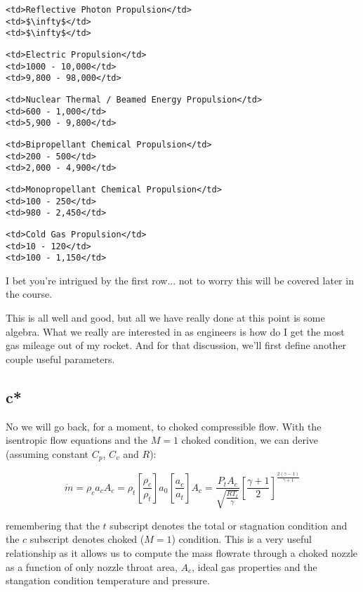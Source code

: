 \documentclass[11pt]{article}
\begin{document}
\begin{verbatim}
<td>Reflective Photon Propulsion</td>
<td>$\infty$</td>
<td>$\infty$</td>
\end{verbatim}

\begin{verbatim}
<td>Electric Propulsion</td>
<td>1000 - 10,000</td>
<td>9,800 - 98,000</td>
\end{verbatim}

\begin{verbatim}
<td>Nuclear Thermal / Beamed Energy Propulsion</td>
<td>600 - 1,000</td>
<td>5,900 - 9,800</td>
\end{verbatim}

\begin{verbatim}
<td>Bipropellant Chemical Propulsion</td>
<td>200 - 500</td>
<td>2,000 - 4,900</td>
\end{verbatim}

\begin{verbatim}
<td>Monopropellant Chemical Propulsion</td>
<td>100 - 250</td>
<td>980 - 2,450</td>
\end{verbatim}

\begin{verbatim}
<td>Cold Gas Propulsion</td>
<td>10 - 120</td>
<td>100 - 1,150</td>
\end{verbatim}

I bet you're intrigued by the first row... not to worry this will be
covered later in the course.

This is all well and good, but all we have really done at this point is
some algebra. What we really are interested in as engineers is how do I
get the most gas mileage out of my rocket. And for that discussion,
we'll first define another couple useful parameters.

    \subsection{c*}\label{c}

No we will go back, for a moment, to choked compressible flow. With the
isentropic flow equations and the \(M=1\) choked condition, we can
derive (assuming constant \(C_p\), \(C_v\) and \(R\)):

\[\dot{m} = \rho_c a_c A_c  = \rho_t \left[ \frac{\rho_c}{\rho_t}\right]a_0 \left[ \frac{a_c}{a_t}\right]A_c = \frac{P_t A_c}{\sqrt{\frac{R T_t}{\gamma}}} \left[\frac{\gamma + 1}{2}\right]^{\frac{2(\gamma-1)}{\gamma+1}}\]

remembering that the \(t\) subscript denotes the total or stagnation
condition and the \(c\) subscript denotes choked (\(M=1\)) condition.
This is a very useful relationship as it allows us to compute the mass
flowrate through a choked nozzle as a function of only nozzle throat
area, \(A_c\), ideal gas properties and the stangation condition
temperature and pressure.
\end{document}
